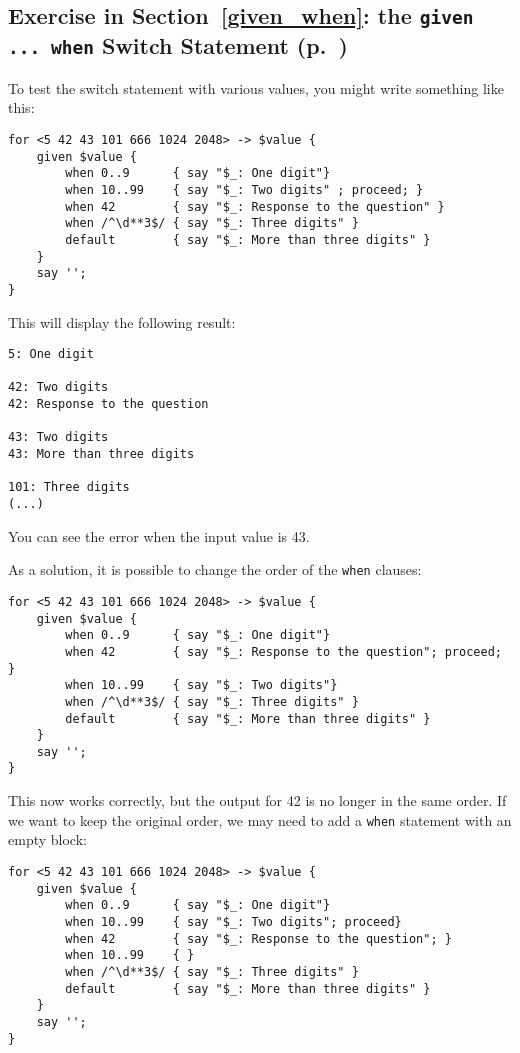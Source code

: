 \subsection{Exercise in Section~\ref{given_when}: the {\tt given ... when} Switch Statement (p.~\pageref{proceed_ex})}
\label{sol_proceed_ex}

To test the switch statement with various values, you might 
write something like this:

\begin{verbatim}
for <5 42 43 101 666 1024 2048> -> $value {
    given $value {
        when 0..9      { say "$_: One digit"}
        when 10..99    { say "$_: Two digits" ; proceed; }
        when 42        { say "$_: Response to the question" }
        when /^\d**3$/ { say "$_: Three digits" }
        default        { say "$_: More than three digits" }
    }
    say '';
}
\end{verbatim}

This will display the following result:

\begin{verbatim}
5: One digit

42: Two digits
42: Response to the question

43: Two digits
43: More than three digits

101: Three digits
(...)
\end{verbatim}

You can see the error when the input value is 43.

As a solution, it is possible to change the order of the 
{\tt when} clauses:

\begin{verbatim}
for <5 42 43 101 666 1024 2048> -> $value {
    given $value {
        when 0..9      { say "$_: One digit"}
        when 42        { say "$_: Response to the question"; proceed; }
        when 10..99    { say "$_: Two digits"}
        when /^\d**3$/ { say "$_: Three digits" }
        default        { say "$_: More than three digits" }
    }
    say '';
}
\end{verbatim}

This now works correctly, but the output for 42 is no longer 
in the same order. If we want to keep the original order,  
we may need to add a {\tt when} statement with an empty block:

\begin{verbatim}
for <5 42 43 101 666 1024 2048> -> $value {
    given $value {
        when 0..9      { say "$_: One digit"}
        when 10..99    { say "$_: Two digits"; proceed}
        when 42        { say "$_: Response to the question"; }
        when 10..99    { }
        when /^\d**3$/ { say "$_: Three digits" }
        default        { say "$_: More than three digits" }
    }
    say '';
}
\end{verbatim}

